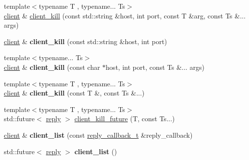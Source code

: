 \begin{DoxyCompactItemize}
\item 
{\footnotesize template$<$typename T , typename... Ts$>$ }\\\mbox{\hyperlink{classcpp__redis_1_1client}{client}} \& \mbox{\hyperlink{classcpp__redis_1_1client_ae4090830d1710276c33ff5a74eba2e4b}{client\+\_\+kill}} (const std\+::string \&host, int port, const T \&arg, const Ts \&... args)
\item 
\mbox{\label{classcpp__redis_1_1client_a3163e1f29d65a5e7b0d4165be154fb96}} 
\mbox{\hyperlink{classcpp__redis_1_1client}{client}} \& {\bfseries client\+\_\+kill} (const std\+::string \&host, int port)
\item 
\mbox{\label{classcpp__redis_1_1client_a38df8e614a5ac9533a1993b7dec7be6b}} 
{\footnotesize template$<$typename... Ts$>$ }\\\mbox{\hyperlink{classcpp__redis_1_1client}{client}} \& {\bfseries client\+\_\+kill} (const char $\ast$host, int port, const Ts \&... args)
\item 
\mbox{\label{classcpp__redis_1_1client_a1e2dd6cdcdb4307ceda0f866fe0a154f}} 
{\footnotesize template$<$typename T , typename... Ts$>$ }\\\mbox{\hyperlink{classcpp__redis_1_1client}{client}} \& {\bfseries client\+\_\+kill} (const T \&, const Ts \&...)
\item 
{\footnotesize template$<$typename T , typename... Ts$>$ }\\std\+::future$<$ \mbox{\hyperlink{classcpp__redis_1_1reply}{reply}} $>$ \mbox{\hyperlink{classcpp__redis_1_1client_aa3e8686d5c21bd654a6c67179d988d5e}{client\+\_\+kill\+\_\+future}} (T, const Ts...)
\item 
\mbox{\label{classcpp__redis_1_1client_a9c2e307ab54f42ce50bdd42e1c6a363b}} 
\mbox{\hyperlink{classcpp__redis_1_1client}{client}} \& {\bfseries client\+\_\+list} (const \mbox{\hyperlink{classcpp__redis_1_1client_af7a65eb21aa25230bfbb0b0203c4fc04}{reply\+\_\+callback\+\_\+t}} \&reply\+\_\+callback)
\item 
\mbox{\label{classcpp__redis_1_1client_a0480140cc584e6dd2a0a6fab9da10cc5}} 
std\+::future$<$ \mbox{\hyperlink{classcpp__redis_1_1reply}{reply}} $>$ {\bfseries client\+\_\+list} ()
\item 

\end{DoxyCompactItemize}
